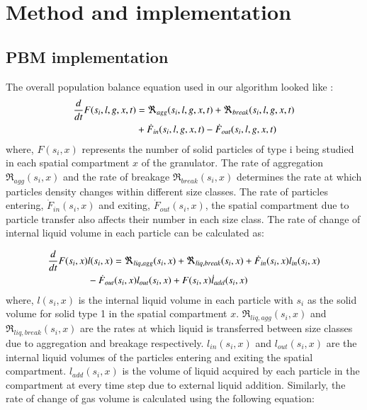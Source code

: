 \documentclass[preprint,10pt,authoryear,review]{elsarticle}
\begin{document}
\section{Method and implementation}
\label{secMethods}
\subsection{PBM implementation}
The overall population balance equation used in our algorithm looked like \citep{ramkrishna2014}:
\begin{align}
\frac{d}{dt}F(s_i,l,g,x,t)&=\Re_{agg}(s_i,l,g,x,t)+\Re_{break}(s_i,l,g,x,t)\notag\\ 
&+\dot{F}_{in}(s_i,l,g,x,t)-\dot{F}_{out}(s_i,l,g,x,t)
\label{eqn:mthds_pbm_overall} 
\end{align}
where, $F(s_i,x)$ represents the number of solid particles of type i being studied in each spatial 
compartment $x$ of the granulator. The rate of aggregation $\Re_{agg}(s_i,x)$ 
and the rate of breakage $\Re_{break}(s_i,x)$ determines the rate at which particles density
changes within different size classes. The rate of particles entering, $\dot{F}_{in}(s_i,x)$ 
and exiting, $\dot{F}_{out}(s_i,x)$, the spatial compartment due to particle transfer also 
affects their number in each size class. The rate of change of internal liquid volume in each 
particle can be calculated as: 

\begin{align}
\frac{d}{dt}F(s_i,x)&l(s_i,x)= 
\Re_{liq,agg}(s_i,x)+\Re_{liq,break}(s_i,x)+\dot{F}_{in}(s_i,x)l_{in}(s_i,x)\notag\\
&-\dot{F}_{out}(s_i,x)l_{out}(s_i,x)+F(s_i,x)\dot{l}_{add}(s_i,x)
\label{eqn:mthds_pbm_rate} 
\end{align}
where, $l(s_i,x)$ is the internal liquid volume in each particle with ${s_i}$ as the 
solid volume for solid type 1 in the spatial compartment $x$. 
$\Re_{liq,agg}(s_i,x)$ and $\Re_{liq,break}(s_i,x)$ are the rates at which liquid is transferred 
between size classes due to aggregation and breakage respectively. $l_{in}(s_i,x)$ 
and $l_{out}(s_i,x)$ are the internal liquid volumes of the particles entering and exiting 
the spatial compartment. $l_{add}(s_i,x)$ is the volume of liquid acquired 
by each particle in the compartment at every time step due to external liquid addition.
Similarly, the rate of change of gas volume is calculated using the following equation: 
\end{document}
